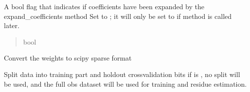 \documentclass[letterpaper,10pt,english]{sphinxmanual}
\begin{document}
\begin{fulllineitems}
\begin{fulllineitems}
\begin{fulllineitems}
\begin{quote}
\begin{description}
\end{description}\end{quote}

\end{fulllineitems}


\begin{fulllineitems}
\label{\detokenize{kalman:glomar_gridding.autocorrelation.LassoEstimate_AR1.expanded}}
\pysigstartsignatures
\pysigline
{}
\pysigstopsignatures
\sphinxAtStartPar
A bool flag that indicates if coefficients
have been expanded by the expand\_coefficients method
Set to ; it will only be set to  if
method  is called later.
\begin{quote}\begin{description}
\sphinxAtStartPar
bool

\end{description}\end{quote}

\end{fulllineitems}


\end{fulllineitems}


\begin{fulllineitems}
\label{\detokenize{kalman:glomar_gridding.autocorrelation.LassoEstimate_AR1.make_coeff_sparse}}
\pysigstartsignatures
\pysiglinewithargsret
{}
{}
{}
\pysigstopsignatures
\sphinxAtStartPar
Convert the weights to scipy sparse format

\end{fulllineitems}


\begin{fulllineitems}
\label{\detokenize{kalman:glomar_gridding.autocorrelation.LassoEstimate_AR1.split_holdout}}
\pysigstartsignatures
\pysiglinewithargsret
{}
{}
{}
\pysigstopsignatures
\sphinxAtStartPar
Split data into training part and holdout cross\sphinxhyphen{}validation bits
if  is , no split will be used,
and the full obs dataset will be used for training and residue
estimation.


\end{fulllineitems}
\end{fulllineitems}
\end{document}
